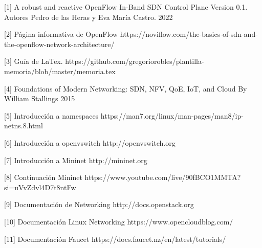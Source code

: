 \documentclass[a4paper, 12pt]{book}
\begin{document}
	\cleardoublepage
	
	
	\cleardoublepage
	
	
	 
	
	[1]  A robust and reactive
	OpenFlow In-Band SDN Control Plane
	Version 0.1. Autores Pedro de las Heras y Eva María Castro. 2022
	
	[2]  Página informativa de OpenFlow https://noviflow.com/the-basics-of-sdn-and-the-openflow-network-architecture/ 
		
	[3]  Guía de LaTex.  https://github.com/gregoriorobles/plantilla-memoria/blob/master/memoria.tex
	
	[4]  Foundations of Modern Networking: SDN, NFV, QoE, IoT, and Cloud By William Stallings 2015
	
	[5]  Introducción a namespaces https://man7.org/linux/man-pages/man8/ip-netns.8.html
	
	[6]  Introducción a openvswitch http://openvswitch.org
	
	[7]  Introducción a Mininet http://mininet.org
	
	[8]  Continuación Mininet https://www.youtube.com/live/90fBCO1MMTA?si=uVvZdvl4D7t8ntFw
	
	[9]  Documentación de Networking http://docs.openstack.org
	
	[10] Documentación Linux Networking https://www.opencloudblog.com/
	
	[11] Documentación Faucet https://docs.faucet.nz/en/latest/tutorials/
 	
	
\end{document}
